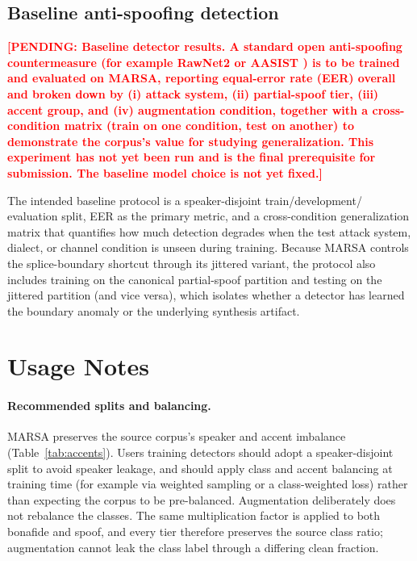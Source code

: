 \documentclass[11pt]{article}
\newcommand{\PENDING}[1]{\textcolor{red}{\textbf{[PENDING: #1]}}}
\begin{document}
\subsection*{Baseline anti-spoofing detection}

\PENDING{Baseline detector results. A standard open anti-spoofing
countermeasure (for example RawNet2 \citep{rawnet2} or AASIST
\citep{aasist}) is to be trained and evaluated on MARSA, reporting
equal-error rate (EER) overall and broken down by (i) attack system,
(ii) partial-spoof tier, (iii) accent group, and (iv) augmentation
condition, together with a cross-condition matrix (train on one
condition, test on another) to demonstrate the corpus's value for
studying generalization. This experiment has not yet been run and is the
final prerequisite for submission. The baseline model choice is not yet
fixed.}

The intended baseline protocol is a speaker-disjoint train/development/
evaluation split, EER as the primary metric, and a cross-condition
generalization matrix that quantifies how much detection degrades when
the test attack system, dialect, or channel condition is unseen during
training. Because MARSA controls the splice-boundary shortcut through its
jittered variant, the protocol also includes training on the canonical
partial-spoof partition and testing on the jittered partition (and vice
versa), which isolates whether a detector has learned the boundary
anomaly or the underlying synthesis artifact.

\section*{Usage Notes}

\paragraph{Recommended splits and balancing.} MARSA preserves the source
corpus's speaker and accent imbalance (Table~\ref{tab:accents}). Users
training detectors should adopt a speaker-disjoint split to avoid
speaker leakage, and should apply class and accent balancing at training
time (for example via weighted sampling or a class-weighted loss) rather
than expecting the corpus to be pre-balanced. Augmentation deliberately
does not rebalance the classes. The same multiplication factor is
applied to both bonafide and spoof, and every tier therefore preserves
the source class ratio; augmentation cannot leak the class label
through a differing clean fraction.
\end{document}
